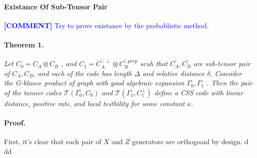 \documentclass{article}
\newcommand{\commentt}[1]{\textcolor{blue}{ \textbf{[COMMENT]} #1}}
\newcommand{\ctt}[1]{\commentt{#1}}
\begin{document}
\begin{multicols*}{2}
 \paragraph{Existance Of Sub-Tensor Pair } \ctt{ Try to prove existance by the probablistic method.} 
 \paragraph{Theorem 1.} \textit{ Let $C_{0} = C_{A}\otimes C_{B}$ , and $C_{1} = C_{A}^{\prime, \perp} \otimes C_{B}^{\prime, perp}$ scuh that $C_{A}^\prime, C_{B}^\prime$ are sub-tensor pair of $C_{A},C_{B}$, and each of the code has length $\Delta$ and relative distance $\delta$. Consider the G-blance product of graph with good algebraic expansion $\Gamma^{\square}_{0},\Gamma^{\square}_{1}$ . Then the pair of the tanner codes $\mathcal{T}\left( \Gamma^{\square}_{0}, C_0 \right)$ and  $\mathcal{T}\left( \Gamma^{\square}_{1}, C_{1}^{\perp} \right)$ define a CSS code with linear distance, positive rate, and local testbility for some constant $\kappa$.} 

 \paragraph{Proof.} First, it's clear that each pair of $X$ and $Z$ generators are orthogoanl by design. d dd     
\end{multicols*}
\end{document}
